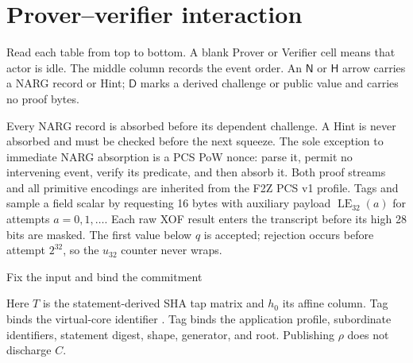 \section{Prover--verifier interaction}
\label{sec:sha-interaction}

\newcommand{\piq}{\pi_q}

Read each table from top to bottom.  A blank Prover or Verifier cell means that
actor is idle.  The middle column records the event order.  An $\mathsf N$ or
$\mathsf H$ arrow carries a NARG record or Hint; $\mathsf D$ marks a derived
challenge or public value and carries no proof bytes.

Every NARG record is absorbed before its dependent challenge.  A Hint is never
absorbed and must be checked before the next squeeze.  The sole exception to
immediate NARG absorption is a PCS PoW nonce: parse it, permit no intervening
event, verify its predicate, and then absorb it.  Both proof streams and all
primitive encodings are inherited from the F2Z PCS v1 profile.
Tags  and  sample a field scalar by requesting
16 bytes with auxiliary payload $\operatorname{LE}_{32}(a)$ for attempts
$a=0,1,\ldots$.  Each raw XOF result enters the transcript before its high
28 bits are masked.  The first value below $q$ is accepted; rejection occurs
before attempt $2^{32}$, so the $u_{32}$ counter never wraps.

\clgreset

\begin{pvstepzero}{Fix the input and bind the commitment}{%
}
\begin{pvexchange}
\Psend{\Dbadge{\rho}}
\end{pvexchange}
Here $T$ is the statement-derived SHA tap matrix and $h_0$ its affine column.
Tag  binds the virtual-core identifier \coreprofileid.
Tag  binds the application profile, subordinate identifiers,
statement digest, shape, generator, and root.
Publishing $\rho$ does not discharge $C$.
\end{pvstepzero}

